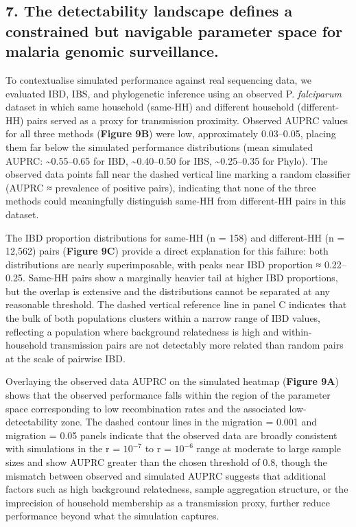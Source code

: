 \documentclass[
  11pt,
]{article}
\begin{document}
\subsection{\texorpdfstring{\textbf{7. The detectability landscape
defines a constrained but navigable parameter space for malaria genomic
surveillance.}}{7. The detectability landscape defines a constrained but navigable parameter space for malaria genomic surveillance.}}\label{the-detectability-landscape-defines-a-constrained-but-navigable-parameter-space-for-malaria-genomic-surveillance.}

To contextualise simulated performance against real sequencing data, we
evaluated IBD, IBS, and phylogenetic inference using an observed P.
\emph{falciparum} dataset in which same household (same-HH) and
different household (different-HH) pairs served as a proxy for
transmission proximity. Observed AUPRC values for all three methods
(\textbf{Figure 9B}) were low, approximately 0.03--0.05, placing them
far below the simulated performance distributions (mean simulated AUPRC:
\textasciitilde0.55--0.65 for IBD, \textasciitilde0.40--0.50 for IBS,
\textasciitilde0.25--0.35 for Phylo). The observed data points fall near
the dashed vertical line marking a random classifier (AUPRC ≈ prevalence
of positive pairs), indicating that none of the three methods could
meaningfully distinguish same-HH from different-HH pairs in this
dataset.

The IBD proportion distributions for same-HH (n = 158) and different-HH
(n = 12,562) pairs (\textbf{Figure 9C}) provide a direct explanation for
this failure: both distributions are nearly superimposable, with peaks
near IBD proportion ≈ 0.22--0.25. Same-HH pairs show a marginally
heavier tail at higher IBD proportions, but the overlap is extensive and
the distributions cannot be separated at any reasonable threshold. The
dashed vertical reference line in panel C indicates that the bulk of
both populations clusters within a narrow range of IBD values,
reflecting a population where background relatedness is high and
within-household transmission pairs are not detectably more related than
random pairs at the scale of pairwise IBD.

Overlaying the observed data AUPRC on the simulated heatmap
(\textbf{Figure 9A}) shows that the observed performance falls within
the region of the parameter space corresponding to low recombination
rates and the associated low-detectability zone. The dashed contour
lines in the migration = 0.001 and migration = 0.05 panels indicate that
the observed data are broadly consistent with simulations in the r =
\(10^{-7}\) to r = \(10^{-6}\) range at moderate to large sample sizes
and show AUPRC greater than the chosen threshold of 0.8, though the
mismatch between observed and simulated AUPRC suggests that additional
factors such as high background relatedness, sample aggregation
structure, or the imprecision of household membership as a transmission
proxy, further reduce performance beyond what the simulation captures.
\end{document}
